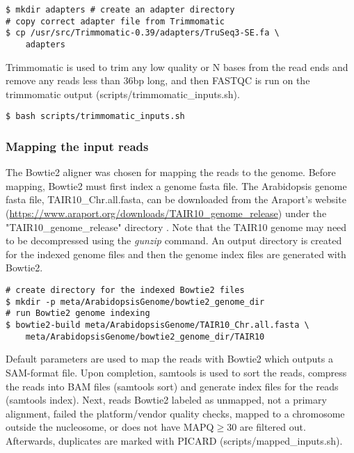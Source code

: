 \documentclass{article}
\begin{document}
\begin{sloppypar}
\begin{verbatim}
$ mkdir adapters # create an adapter directory
# copy correct adapter file from Trimmomatic
$ cp /usr/src/Trimmomatic-0.39/adapters/TruSeq3-SE.fa \
    adapters
\end{verbatim}

Trimmomatic is used to trim any low quality or N bases from the read ends and remove any reads less than 36bp long, and then FASTQC is run on the trimmomatic output ({\selectfont scripts/trimmomatic\_inputs.sh}). 

\begin{verbatim}
$ bash scripts/trimmomatic_inputs.sh
\end{verbatim}

\subsubsection{Mapping the input reads}

The Bowtie2 aligner was chosen for mapping the reads to the genome. Before mapping, Bowtie2 must first index a  genome fasta file. The Arabidopsis genome fasta file, TAIR10\_Chr.all.fasta, can be downloaded from the Araport's website (\url{https://www.araport.org/downloads/TAIR10_genome_release}) under the "TAIR10\_genome\_release" directory \cite{Araport11}. Note that the TAIR10 genome may need to be decompressed  using the \emph{gunzip} command. An output directory is created for the indexed genome files and then the genome index files are generated with Bowtie2.

\begin{verbatim}
# create directory for the indexed Bowtie2 files
$ mkdir -p meta/ArabidopsisGenome/bowtie2_genome_dir
# run Bowtie2 genome indexing
$ bowtie2-build meta/ArabidopsisGenome/TAIR10_Chr.all.fasta \
    meta/ArabidopsisGenome/bowtie2_genome_dir/TAIR10
\end{verbatim}

Default parameters are used to map the reads with Bowtie2 which outputs a SAM-format file. Upon completion, samtools is used to sort the reads, compress the reads into BAM files (samtools sort) and generate index files for the reads (samtools index).  Next, reads Bowtie2 labeled as unmapped, not a primary alignment, failed the platform/vendor quality checks, mapped to a chromosome outside the nucleosome, or does not have MAPQ$\geq$30 are filtered out. Afterwards, duplicates are marked with PICARD  ({\selectfont scripts/mapped\_inputs.sh}).


\end{sloppypar}
\end{document}
